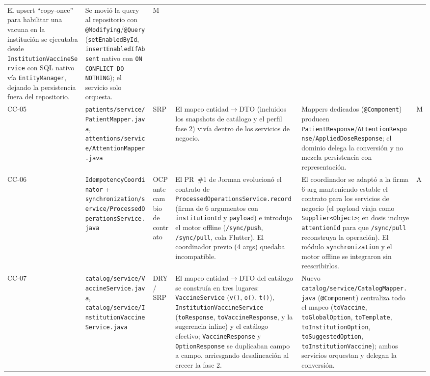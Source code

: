 \documentclass[11pt,a4paper]{article}
\begin{document}
\begin{footnotesize}
\begin{longtable}{@{}p{0.9cm}p{3.1cm}p{2.4cm}p{3.5cm}p{3.7cm}p{1.0cm}@{}}
El upsert ``copy-once'' para habilitar una vacuna en la institución se ejecutaba desde \texttt{InstitutionVaccineService} con SQL nativo vía \texttt{EntityManager}, dejando la persistencia fuera del repositorio. &
Se movió la query al repositorio con \texttt{@Modifying}/\texttt{@Query} (\texttt{setEnabledById}, \texttt{insertEnabledIfAbsent} nativo con \texttt{ON CONFLICT DO NOTHING}); el servicio solo orquesta. &
M \\
CC-05 & \texttt{patients/service/PatientMapper.java}, \texttt{attentions/service/AttentionMapper.java} & SRP &
El mapeo entidad{}${}\to{}$DTO (incluidos los snapshots de catálogo y el perfil fase 2) vivía dentro de los servicios de negocio. &
Mappers dedicados (\texttt{@Component}) producen \texttt{PatientResponse}/\texttt{AttentionResponse}/\texttt{AppliedDoseResponse}; el dominio delega la conversión y no mezcla persistencia con representación. &
M \\
CC-06 & \texttt{IdempotencyCoordinator} + \texttt{synchronization/service/ProcessedOperationsService.java} & OCP ante cambio de contrato &
El PR~\#1 de Jorman evolucionó el contrato de \texttt{ProcessedOperationsService.record} (firma de 6 argumentos con \texttt{institutionId} y \texttt{payload}) e introdujo el motor offline (\texttt{/sync/push}, \texttt{/sync/pull}, cola Flutter). El coordinador previo (4 args) quedaba incompatible. &
El coordinador se adaptó a la firma 6-arg manteniendo estable el contrato para los servicios de negocio (el payload viaja como \texttt{Supplier\textless Object\textgreater}; en dosis incluye \texttt{attentionId} para que \texttt{/sync/pull} reconstruya la operación). El módulo \texttt{synchronization} y el motor offline se integraron sin reescribirlos. &
A \\
CC-07 & \texttt{catalog/service/VaccineService.java}, \texttt{catalog/service/InstitutionVaccineService.java} & DRY / SRP &
El mapeo entidad{}${}\to{}$DTO del catálogo se construía en tres lugares: \texttt{VaccineService} (\texttt{v()}, \texttt{o()}, \texttt{t()}), \texttt{InstitutionVaccineService} (\texttt{toResponse}, \texttt{toVaccineResponse}, y la sugerencia inline) y el catálogo efectivo; \texttt{VaccineResponse} y \texttt{OptionResponse} se duplicaban campo a campo, arriesgando desalineación al crecer la fase 2. &
Nuevo \texttt{catalog/service/CatalogMapper.java} (\texttt{@Component}) centraliza todo el mapeo (\texttt{toVaccine}, \texttt{toGlobalOption}, \texttt{toTemplate}, \texttt{toInstitutionOption}, \texttt{toSuggestedOption}, \texttt{toInstitutionVaccine}); ambos servicios orquestan y delegan la conversión. &

\end{longtable}
\end{footnotesize}
\end{document}
